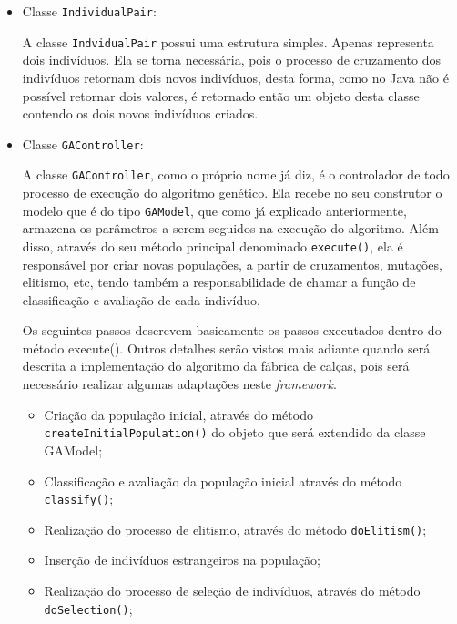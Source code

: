 \begin{itemize}
\begin{itemize}
	\end{itemize}
	
	
	\item Classe \texttt{IndividualPair}:
	\par A classe \texttt{IndvidualPair} possui uma estrutura simples. Apenas
	representa dois indivíduos. Ela se torna necessária, pois o processo de
	cruzamento dos indivíduos retornam dois novos indivíduos, desta forma, como 
	no Java não é possível retornar dois valores, é retornado então um objeto desta
	classe contendo os dois novos indivíduos criados. 
	
	
	\item Classe \texttt{GAController}:
	\par A classe \texttt{GAController}, como o próprio nome já diz, é o
	controlador de todo processo de execução do algoritmo genético.
	Ela recebe no seu construtor o modelo que é do tipo \texttt{GAModel}, que como
	já explicado anteriormente, armazena os parâmetros a serem seguidos na
	execução do algoritmo. Além disso, através do seu método principal
	denominado \texttt{execute()}, ela é responsável por criar novas populações, a
	partir de cruzamentos, mutações, elitismo, etc, tendo também a
	responsabilidade de chamar a função de classificação e avaliação de cada indivíduo.
	
	\par Os seguintes passos descrevem basicamente os passos executados dentro do
	método execute(). Outros detalhes serão vistos mais adiante quando será
	descrita a implementação do algoritmo da fábrica de calças, pois será
	necessário realizar algumas adaptações neste \textit{framework}.
	
	\begin{itemize}
		\item	Criação da população inicial, através do método \texttt{createInitialPopulation()}
		do objeto que será extendido da classe GAModel;
		
		\item Classificação e avaliação da população inicial através do método
		\texttt{classify()};
		
		\item Realização do processo de elitismo, através do método
		\texttt{doElitism()};
		
		\item Inserção de indivíduos estrangeiros na população;
		
		\item Realização do processo de seleção de indivíduos, através do método \texttt{doSelection()};
		

\end{itemize}
\end{itemize}
